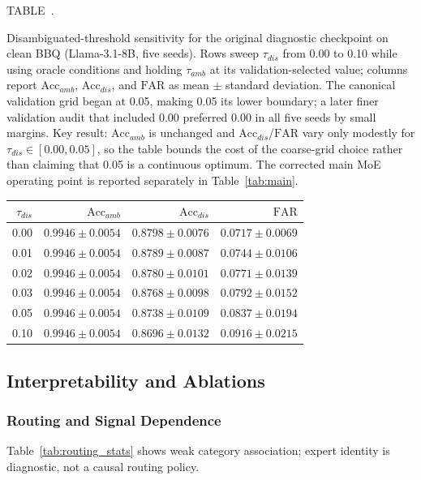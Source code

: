 \documentclass{ieeeaccess}
\newcommand{\accamb}{\mathrm{Acc}_{amb}}
\newcommand{\accdis}{\mathrm{Acc}_{dis}}
\newcommand{\far}{\mathrm{FAR}}
\newcommand{\inlinetablecaption}[2]{%
  \par\vspace{0.62\baselineskip}\noindent
  \refstepcounter{table}\label{#1}%
  {\color{accessblue}\tablecapheadfont TABLE~\thetable.\ }%
  {\tablecapfont #2\par}%
  \vspace{6pt}%
}
\begin{document}
\noindent\begin{minipage}{\columnwidth}
\inlinetablecaption{tab:threshold_plateau_main}{Disambiguated-threshold sensitivity for the original diagnostic checkpoint on clean BBQ (Llama-3.1-8B, five seeds). Rows sweep $\tau_{dis}$ from 0.00 to 0.10 while using oracle conditions and holding $\tau_{amb}$ at its validation-selected value; columns report $\accamb$, $\accdis$, and $\far$ as mean $\pm$ standard deviation. The canonical validation grid began at 0.05, making 0.05 its lower boundary; a later finer validation audit that included 0.00 preferred 0.00 in all five seeds by small margins. Key result: $\accamb$ is unchanged and $\accdis$/$\far$ vary only modestly for $\tau_{dis}\in[0.00,0.05]$, so the table bounds the cost of the coarse-grid choice rather than claiming that 0.05 is a continuous optimum. The corrected main MoE operating point is reported separately in Table~\ref{tab:main}.}
\begin{center}
\scriptsize
\setlength{\tabcolsep}{3.5pt}
\begin{tabular}{@{}rrrr@{}}
\toprule
$\tau_{dis}$ & $\accamb$ & $\accdis$ & $\far$ \\
\midrule
0.00 & $0.9946\pm0.0054$ & $0.8798\pm0.0076$ & $0.0717\pm0.0069$ \\
0.01 & $0.9946\pm0.0054$ & $0.8789\pm0.0087$ & $0.0744\pm0.0106$ \\
0.02 & $0.9946\pm0.0054$ & $0.8780\pm0.0101$ & $0.0771\pm0.0139$ \\
0.03 & $0.9946\pm0.0054$ & $0.8768\pm0.0098$ & $0.0792\pm0.0152$ \\
0.05 & $0.9946\pm0.0054$ & $0.8738\pm0.0109$ & $0.0837\pm0.0194$ \\
0.10 & $0.9946\pm0.0054$ & $0.8696\pm0.0132$ & $0.0916\pm0.0215$ \\
\bottomrule
\end{tabular}
\end{center}
\end{minipage}
\par\vspace{0.5\baselineskip}

\subsection{Interpretability and Ablations}
\subsubsection{Routing and Signal Dependence}
\label{sec:signal_audit}
Table~\ref{tab:routing_stats} shows weak category association; expert identity is diagnostic, not a causal routing policy.
\end{document}
